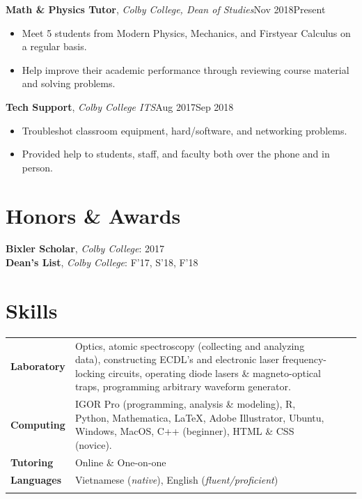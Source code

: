 \documentclass[a4paper, 10.5pt]{article}
\begin{document}
	\indent \indent \textbf{Math \& Physics Tutor}, \textit{Colby College, Dean of Studies}\hfill Nov 2018\textemdash Present
	\begin{itemize}[noitemsep, nolistsep]
		\setlength{\itemindent}{0.2in}
		\item Meet 5 students from Modern Physics, Mechanics, and First\textendash year Calculus on a regular basis.
		\item Help improve their academic performance through reviewing course material and solving problems.\\
	\end{itemize}
	\indent \indent \textbf{Tech Support}, \textit{Colby College ITS}\hfill Aug 2017\textemdash Sep 2018
	\begin{itemize}[noitemsep, nolistsep]
		\setlength{\itemindent}{0.2in}
		\item Troubleshot classroom equipment, hard/software, and networking problems.
		\item Provided help to students, staff, and faculty both over the phone and in person.\\
	\end{itemize}

	\section*{\normalsize{{\color{colby}Honors \& Awards}}}
	\indent \textbf{Bixler Scholar}, \textit{Colby College}: 2017\\
	\indent \textbf{Dean's List}, \textit{Colby College}: F'17, S'18, F'18\\
	
	\section*{\normalsize{{\color{colby}Skills}}}
		\begin{tabular}{lp{13.5cm}lp{8in}}
			
			\textbf{Laboratory} & Optics, atomic spectroscopy (collecting and analyzing data), constructing ECDL's and electronic laser frequency-locking circuits, operating diode lasers \& magneto-optical traps, programming arbitrary waveform generator.\\
			
			\textbf{Computing} & IGOR Pro (programming, analysis \& modeling), R, Python, Mathematica, \LaTeX{}, Adobe Illustrator, Ubuntu, Windows, MacOS, C++ (beginner), HTML \& CSS (novice).\\
			
			\textbf{Tutoring} & Online \& One-on-one\\
			
			\textbf{Languages} & Vietnamese (\textit{native}), English (\textit{fluent/proficient})\\\\
			
		\end{tabular}
	
\end{document}
